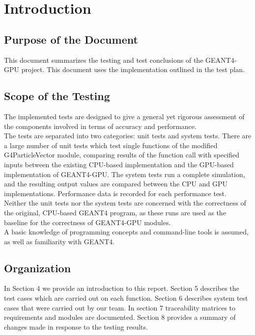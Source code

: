 \documentclass[12pt]{article}
\begin{document}
\section{Introduction}
\subsection{Purpose of the Document}
This document summarizes the testing and test conclusions of the GEANT4-GPU project. This document uses the implementation outlined in the test plan.

\subsection{Scope of the Testing}
The implemented tests are designed to give a general yet rigorous assessment of the components involved in terms of accuracy and performance.\\

The tests are separated into two categories: unit tests and system tests. There are a large number of unit tests which test single functions of the modified G4ParticleVector module, comparing results of the function call with specified inputs between the existing CPU-based implementation and the GPU-based implementation of GEANT4-GPU. The system tests run a complete simulation, and the resulting output values are compared between the CPU and GPU implementations. Performance data is recorded for each performance test.\\

Neither the unit tests nor the system tests are concerned with the correctness of the original, CPU-based GEANT4 program, as these runs are used as the baseline for the correctness of GEANT4-GPU modules.\\

A basic knowledge of programming concepts and command-line tools is assumed, as well as familiarity with GEANT4.

\subsection{Organization}
In Section 4 we provide an introduction to this report. Section 5 describes the test cases which are carried out on each function. Section 6 describes system test cases that were carried out by our team. In section 7 traceability matrices to requirements and modules are documented. Section 8 provides a summary of changes made in response to the testing results.
\end{document}

